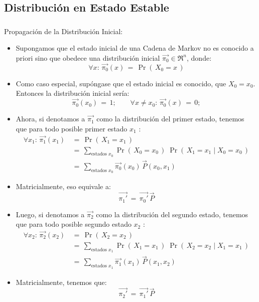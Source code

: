 \documentclass[ 10pt, xcolor = dvipsnames]{beamer}
\begin{document}
\subsection{Distribuci\'on en Estado Estable}

\begin{frame}[allowframebreaks]
\frametitle{\insertsubsection}

Propagaci\'on de la Distribuci\'on Inicial: 
\begin{itemize}
\item Supongamos que el estado inicial de una Cadena de Markov no es conocido \linebreak a priori sino que obedece una distribuci\'on inicial $\vec{\pi_0} \in \Re^n$, donde: 
\[
\forall x \colon \, \vec{\pi_0}(x) \, = \, \Pr( \, X_0 = x \, )
\]
\item Como caso especial, sup\'ongase que el estado inicial es conocido, \eg \linebreak que $X_0 = x_0$. Entonces la distribuci\'on inicial ser\'ia: 
\[
\vec{\pi_0}(x_0) \, = \, 1; \qquad
\forall x \neq x_0 \colon \, \vec{\pi_0}(x) \, = \, 0;
\]
\end{itemize}
\framebreak

\begin{itemize}
\item Ahora, si denotamos a $\vec{\pi_1}$ como la distribuci\'on del primer estado, \linebreak tenemos que para todo posible primer estado $x_1$ :
\begin{align*}
\forall x_1 \colon \, \vec{\pi_1}(x_1) \, 
& = \, \Pr( \, X_1 = x_1 \, ) \\[1ex]
& = \, \sum_{\text{estados } x_0} \Pr( \, X_0 = x_0 \, ) \; \Pr( \, X_1 = x_1 \mid X_0 = x_0 \, ) \\[1ex]
& = \, \sum_{\text{estados } x_0} \vec{\pi_0}(x_0) \, \vec{P}(x_0,x_1)
\end{align*}
\item Matricialmente, eso equivale a: 
\[
\vec{\pi_1'} \, = \, \vec{\pi_0'} \, \vec{P}
\]
\end{itemize}
\framebreak

\begin{itemize}
\item Luego, si denotamos a $\vec{\pi_2}$ como la distribuci\'on del segundo estado, \linebreak tenemos que para todo posible segundo estado $x_2$ :
\begin{align*}
\forall x_2 \colon \, \vec{\pi_2}(x_2) \,
& = \, \Pr( \, X_2 = x_2 \, ) \\[1ex]
& = \, \sum_{\text{estados } x_1} \Pr( \, X_1 = x_1 \, ) \; \Pr( \, X_2 = x_2 \mid X_1 = x_1 \, ) \\[1ex]
& = \, \sum_{\text{estados } x_1} \vec{\pi_1}(x_1) \, \vec{P}(x_1,x_2)
\end{align*}
\item Matricialmente, tenemos que: 
\[
\vec{\pi_2'} \, = \, \vec{\pi_1'} \, \vec{P}
\]
\end{itemize}
\framebreak


\end{frame}
\end{document}
